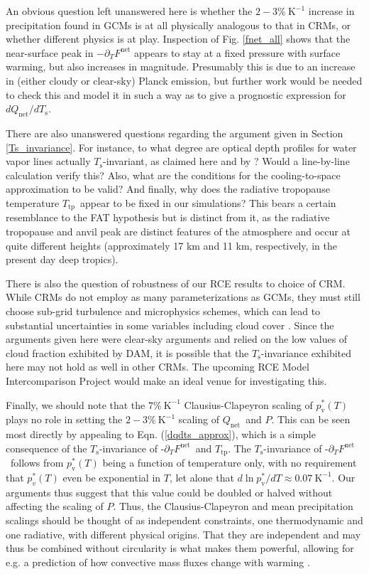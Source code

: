 \documentclass[10pt]{article}
\newcommand{\eqnref}[1]{(\ref{#1})}
\newcommand{\ppt}{\ensuremath{\partial_T}}
\newcommand{\Qnet}{\ensuremath{Q_\mathrm{net}}}
\newcommand{\Fnet}{\ensuremath{F^\mathrm{net}}}
\newcommand{\pvstar}{\ensuremath{p^*_{\mathrm{v}}}}
\newcommand{\Ts}{\ensuremath{T_\mathrm{s}}}
\newcommand{\Ttp}{\ensuremath{T_\mathrm{tp}}}
\newcommand{\Kinverse}{\ensuremath{\mathrm{K^{-1}}}}
\begin{document}
An obvious question left unanswered here is whether the $2 -3\%\ \Kinverse$ increase in precipitation found in GCMs is at all physically analogous to that in CRMs, or whether different physics is at play. Inspection of Fig. \ref{fnet_all} shows that the near-surface peak in $-\ppt \Fnet$ appears to stay at a fixed pressure with surface warming, but also increases in magnitude. Presumably this is due to an increase in (either cloudy or clear-sky) Planck emission, but further work would be needed to check this and model it in such a way as to give a prognostic expression for $d\Qnet/d\Ts$. 

There are also unanswered questions regarding the  argument given in Section \ref{Ts_invariance}. For instance, to what degree are optical depth profiles for water vapor lines actually \Ts-invariant, as claimed here and by \cite{ingram2010}? Would a line-by-line calculation verify this?  Also, what are the conditions for the cooling-to-space approximation to be valid? And finally, why does  the radiative tropopause temperature \Ttp\ appear to be fixed in our simulations? This bears a certain resemblance to the FAT hypothesis but is distinct from it, as the radiative tropopause and anvil peak are distinct features of the atmosphere and occur at quite different heights (approximately 17 km and 11 km, respectively, in the present day deep tropics).

There is also the question of robustness of our RCE results to choice of CRM. While CRMs do not employ as many parameterizations as GCMs, they must still choose sub-grid turbulence and microphysics schemes, which can lead to substantial uncertainties in some variables including cloud cover \citep[e.g.][]{tsushima2015, igel2014}. Since the arguments given here were clear-sky arguments and relied on the low values of  cloud fraction exhibited by DAM, it is possible that the \Ts-invariance exhibited here may not hold as well in other CRMs. The upcoming RCE Model Intercomparison Project \citep[RCEMIP,][]{wing2017b} would make an ideal venue for investigating this.

Finally, we should note that the $7\%\ \Kinverse$ Clausius-Clapeyron scaling of $\pvstar(T)$ plays no role in setting the $2 -3\%\ \Kinverse$  scaling of \Qnet\ and $P$. This can be seen most directly by appealing to Eqn. \eqnref{dqdts_approx}, which is a simple consequence of the \Ts-invariance of -\ppt \Fnet\ and \Ttp. The \Ts-invariance of -\ppt \Fnet\  follows from  $\pvstar(T)$ being a function of temperature only, with no requirement that $p_v^*(T)$ even be exponential in $T$, let alone that $d\ln \pvstar/dT \approx 0.07 \ \Kinverse$.  Our arguments thus suggest that this value could be doubled or halved without affecting the scaling of $P$. Thus, the Clausius-Clapeyron and mean precipitation scalings should be thought of as independent constraints, one thermodynamic and one radiative, with different physical origins. That they are independent and may thus be combined without circularity is what makes them powerful, allowing for e.g. a prediction of how convective mass fluxes change with warming \citep[][]{held2006}.
\end{document}
